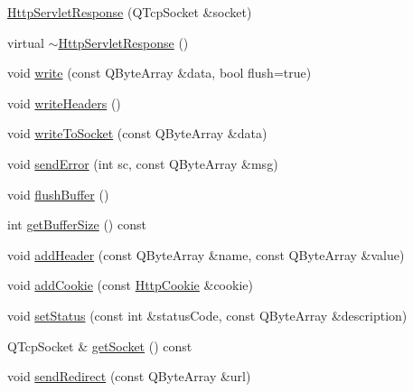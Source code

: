 \begin{DoxyCompactItemize}
\item 
\hyperlink{class_c_w_f_1_1_http_servlet_response_a5c89f340f44874457e680b02ab31d290}{Http\+Servlet\+Response} (Q\+Tcp\+Socket \&socket)
\item 
virtual \hyperlink{class_c_w_f_1_1_http_servlet_response_a2081a62779b85a5805812cb06807f6bb}{$\sim$\+Http\+Servlet\+Response} ()
\item 
void \hyperlink{class_c_w_f_1_1_http_servlet_response_ae4fdbaa3d3edd4234955fadc20cb896c}{write} (const Q\+Byte\+Array \&data, bool flush=true)
\item 
void \hyperlink{class_c_w_f_1_1_http_servlet_response_a6a377703f21bb5578d5103acb2e397d1}{write\+Headers} ()
\item 
void \hyperlink{class_c_w_f_1_1_http_servlet_response_a1e6bf9efa60fa22dd2b058b69bd735c9}{write\+To\+Socket} (const Q\+Byte\+Array \&data)
\item 
void \hyperlink{class_c_w_f_1_1_http_servlet_response_a218be925792dfe06096d63d05e28edce}{send\+Error} (int sc, const Q\+Byte\+Array \&msg)
\item 
void \hyperlink{class_c_w_f_1_1_http_servlet_response_acfe923500ad8cee08c5acf6767e571bc}{flush\+Buffer} ()
\item 
int \hyperlink{class_c_w_f_1_1_http_servlet_response_a11784e6485fb80078afdc00398a23ba7}{get\+Buffer\+Size} () const 
\item 
void \hyperlink{class_c_w_f_1_1_http_servlet_response_a2cf301ef97237d19401d398e36602472}{add\+Header} (const Q\+Byte\+Array \&name, const Q\+Byte\+Array \&value)
\item 
void \hyperlink{class_c_w_f_1_1_http_servlet_response_a3775b3aa5ffde85e61f6e1b8edb6820d}{add\+Cookie} (const \hyperlink{class_c_w_f_1_1_http_cookie}{Http\+Cookie} \&cookie)
\item 
void \hyperlink{class_c_w_f_1_1_http_servlet_response_aeebd12d9d9eab98fb0d1810605e8c2ab}{set\+Status} (const int \&status\+Code, const Q\+Byte\+Array \&description)
\item 
Q\+Tcp\+Socket \& \hyperlink{class_c_w_f_1_1_http_servlet_response_a1b45b744de83577359fb85e1aaffc7dd}{get\+Socket} () const 
\item 
void \hyperlink{class_c_w_f_1_1_http_servlet_response_a665b695119c30234b2b77665c36e010d}{send\+Redirect} (const Q\+Byte\+Array \&url)
\end{DoxyCompactItemize}
